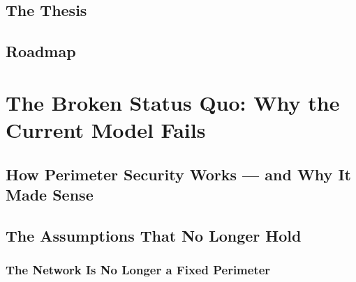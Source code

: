 \documentclass[12pt, letterpaper]{article}
\begin{document}
\subsection{The Thesis}

\subsection{Roadmap}

\section{The Broken Status Quo: Why the Current Model Fails}

\subsection{How Perimeter Security Works — and Why It Made Sense}

\subsection{The Assumptions That No Longer Hold}

    \subsubsection{The Network Is No Longer a Fixed Perimeter}
\end{document}
